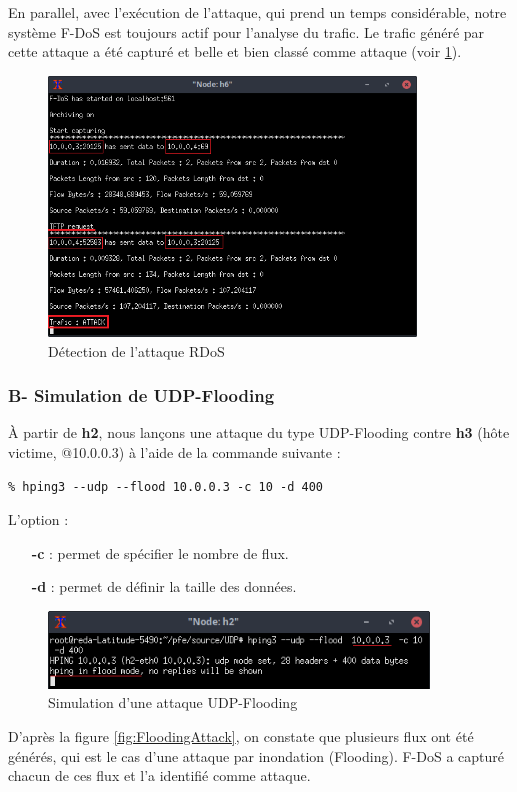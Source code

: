 \noindent En parallel, avec l'exécution de l'attaque, qui prend un temps considérable, notre système F-DoS est toujours actif pour l'analyse du trafic. Le trafic généré par cette attaque a été capturé et belle et bien classé comme attaque (voir \ref{fig:tftpAttack}).
\begin{figure}[h]
\centering
\includegraphics[width=0.87\textwidth]{Figures/simulation/mininet/IDS/attack_tftp}
\decoRule
\caption{Détection de l'attaque RDoS}
\label{fig:tftpAttack}
\end{figure}

\subsubsection{B- Simulation de UDP-Flooding}
À partir de \textbf{h2}, nous lançons une attaque du type UDP-Flooding contre \textbf{h3} (hôte victime, @10.0.0.3) à l'aide de la commande suivante :
\begin{verbatim}
% hping3 --udp --flood 10.0.0.3 -c 10 -d 400
\end{verbatim}
L'option :
\begin{itemize}
\item[\textbf{-c}]: permet de spécifier le nombre de flux.
\item[\textbf{-d}]: permet de définir la taille des données.
\end{itemize}
\begin{figure}[H]
\centering
\includegraphics[width=0.9\textwidth]{Figures/simulation/mininet/UDP/attack_udp_flood}
\decoRule
\caption{Simulation d'une attaque UDP-Flooding}
\label{fig:FloodingAttackSimulation}
\end{figure}
\newpage
D'après la figure \ref{fig:FloodingAttack}, on constate que plusieurs flux ont été générés, qui est le cas d'une attaque par inondation (Flooding). F-DoS a capturé chacun de ces flux et l'a identifié comme attaque.\\

